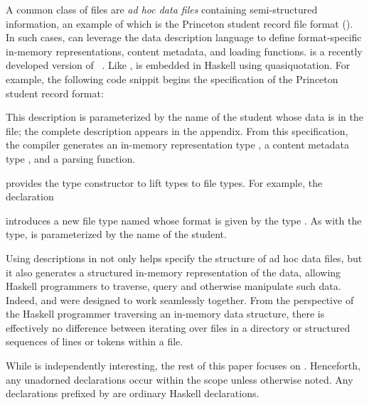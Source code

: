 A common class of files are \textit{ad hoc data files} containing
semi-structured information, an example of which is the Princeton
student record file format (). 
In such cases, \forest{} can leverage the \padshaskell{} data
description language to define format-specific in-memory
representations, content metadata, and loading functions. 
\padshaskell{} is a recently developed version of 
\pads{}~\cite{fisher+:pads,fisher+:popl06,mandelbaum+:pads-ml}.
Like \forest{}, \padshaskell{} is embedded in Haskell using
quasiquotation.  For example, the following code snippit 
begins the \pads{} specification of the Princeton student record
format: 
\noindent
\begin{code}
[pads| 
  \kw{data} Student (name :: String) = < pads decl >
|]
\end{code}
This description is parameterized by the name of the student whose
data is in the file; the complete description appears in the appendix.
From this specification, the \pads{} compiler
generates an in-memory representation type , a content metadata
type , and a parsing function.  

\forest{} provides the  type constructor to lift \pads{}
types to \forest{} file types.  For example, the declaration
\begin{code}
[forest| 
  \kw{type} SFile (n::String) = File (Student n) 
|]
\end{code}
introduces a new file type named  whose format is given by
the \pads{} type .  As with the \pads{} type, 
is parameterized by the name of the student.  

Using \padshaskell{} descriptions in \forest{} not only helps specify
the structure of ad hoc data files, but it also generates a structured
in-memory representation of the data, allowing Haskell programmers to
traverse, query and otherwise manipulate such data.  Indeed,
\padshaskell{} and \forest{} were designed to work seamlessly
together.  From the perspective of the Haskell programmer traversing
an in-memory data structure, there is effectively no difference
between iterating over files in a directory or structured sequences of
lines or tokens within a file.

While \padshaskell{} is independently interesting,
the rest of this paper focuses on \forest{}.  Henceforth, any
unadorned declarations occur within the \forest{} scope
\cd{[forest|...|]} unless otherwise noted.  Any declarations prefixed
by \cd{>} 
are ordinary Haskell declarations.

